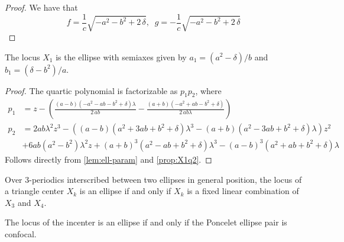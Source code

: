 \begin{proof}
We have that
\[f={\frac {1}{c}\sqrt {-{a}^{2}-{b}^{2}+2\,\delta}}, \;\; g= -{\frac {1}{c}\sqrt {-{a}^{2}-{b}^{2}+2\,\delta}}\]

\end{proof}

\begin{corollary}
The locus $X_1$ is the ellipse with semiaxes given by $a_1=(a^2-\delta)/b$ and $b_1=(\delta-b^2)/a.$

 
\end{corollary}

\begin{proof}
The quartic polynomial is factorizable as $p_1p_2$, where
\begin{align*}
    p_1&=z-\left({\frac { \left( a-b \right)  \left( -{a}^{2}-a b-{b}^{2}+\delta
 \right) \lambda}{2\,a b}}-{\frac { \left( a+b \right)  \left( -{a}^{2}
+a b-{b}^{2}+\delta \right) }{2\,a b\lambda}}\right)
\\
    p_2&=2 a b \lambda^2 z^3 - ((a - b) (a^2 + 3 a b + b^2 + \delta) \lambda^3 - (a + b) (a^2 - 3 a b + b^2 + \delta) \lambda) z^2\\
    &+ 6 a b  (a^2 - b^2) \lambda^2 z + (a + b)^3 (a^2 - a b + b^2 + \delta) \lambda^3 - (a - b)^3 (a^2 + a b + b^2 + \delta) \lambda
\end{align*}
Follows directly from  \cref{lem:ell-param} and  \cref{prop:X1q2}.
\end{proof}

\cite{schwartz2016-com}

\begin{conjecture}
Over 3-periodics interscribed between two ellipses in general position, the locus of a triangle center $X_k$ is an ellipse if and only if $X_k$ is a fixed linear combination of $X_3$ and $X_4$.
\end{conjecture}

\begin{conjecture}
The locus of the incenter is an ellipse if and only if the Poncelet ellipse pair is confocal.
\end{conjecture}